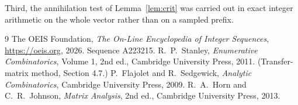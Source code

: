 \documentclass[11pt,a4paper]{article}
\theoremstyle{plain}
\theoremstyle{definition}
\begin{document}
Third, the annihilation test of Lemma~\ref{lem:crit} was carried out in exact integer
arithmetic on the whole vector rather than on a sampled prefix.

\begin{thebibliography}{9}
 The OEIS Foundation, \emph{The On-Line Encyclopedia of Integer
Sequences}, \url{https://oeis.org}, 2026. Sequence A223215.
 R.~P.~Stanley, \emph{Enumerative Combinatorics}, Volume 1, 2nd ed.,
Cambridge University Press, 2011. (Transfer-matrix method, Section 4.7.)
 P.~Flajolet and R.~Sedgewick, \emph{Analytic Combinatorics}, Cambridge
University Press, 2009.
 R.~A.~Horn and C.~R.~Johnson, \emph{Matrix Analysis}, 2nd ed., Cambridge
University Press, 2013.
\end{thebibliography}
\end{document}
